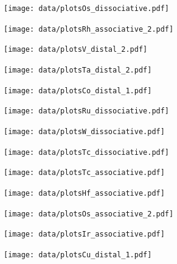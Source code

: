 \begin{figure}
\centering
\texttt{[image: data/plotsOs\_dissociative.pdf]}
\end{figure}

\begin{figure}
\centering
\texttt{[image: data/plotsRh\_associative\_2.pdf]}
\end{figure}

\begin{figure}
\centering
\texttt{[image: data/plotsV\_distal\_2.pdf]}
\end{figure}

\begin{figure}
\centering
\texttt{[image: data/plotsTa\_distal\_2.pdf]}
\end{figure}

\begin{figure}
\centering
\texttt{[image: data/plotsCo\_distal\_1.pdf]}
\end{figure}

\begin{figure}
\centering
\texttt{[image: data/plotsRu\_dissociative.pdf]}
\end{figure}

\begin{figure}
\centering
\texttt{[image: data/plotsW\_dissociative.pdf]}
\end{figure}

\begin{figure}
\centering
\texttt{[image: data/plotsTc\_dissociative.pdf]}
\end{figure}

\begin{figure}
\centering
\texttt{[image: data/plotsTc\_associative.pdf]}
\end{figure}

\begin{figure}
\centering
\texttt{[image: data/plotsHf\_associative.pdf]}
\end{figure}

\begin{figure}
\centering
\texttt{[image: data/plotsOs\_associative\_2.pdf]}
\end{figure}

\begin{figure}
\centering
\texttt{[image: data/plotsIr\_associative.pdf]}
\end{figure}

\begin{figure}
\centering
\texttt{[image: data/plotsCu\_distal\_1.pdf]}
\end{figure}

